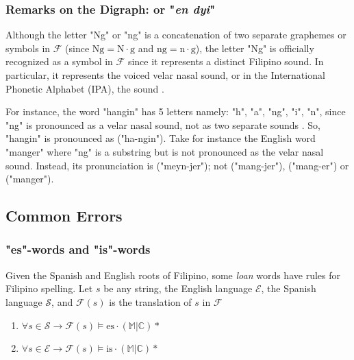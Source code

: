 \subsubsection{Remarks on the Digraph:  or "\textit{en dyi}"}

Although the letter "Ng" or "ng" is a concatenation of two separate graphemes or
symbols in \(\mathcal{F}\) (since \(\text{Ng} = \text{N}\cdot\text{g}\) and
\(\text{ng} = \text{n}\cdot\text{g}\)), the letter "Ng" is officially recognized
as a symbol in \(\mathcal{F}\) since it represents a distinct Filipino sound.
In particular, it represents the voiced velar nasal sound, or in the International
Phonetic Alphabet (IPA), the  sound \cite{Malabonga_2009}.

For instance, the word "hangin" has 5 letters namely: "h", "a", "ng", "i", "n",
since "ng" is pronounced as a velar nasal sound, not as two separate sounds
. So, "hangin" is pronounced as  ("ha-ngin").
Take for instance the English  word "manger" where "ng" is a substring
but is not pronounced as the velar nasal sound. Instead, its pronunciation is
 ("meyn-jer"); not
 ("mang-jer"),
 ("mang-er") or
 ("manger").

\subsection{Common Errors}

\subsubsection{"es"-words and "is"-words}

Given the Spanish and English roots of Filipino, some \textit{loan} words have
rules for Filipino spelling. Let \(s\) be any string, the English language
\(\mathcal{E}\), the Spanish language \(\mathcal{S}\), and \(\mathcal{F}(s)\) is
the translation of \(s\) in \(\mathcal{F}\)

\begin{enumerate}
    \item \(\forall s\in \mathcal{S} \rightarrow \mathcal{F}(s) \models \text{es}\cdot
          (\mathbb{M}|\mathbb{C})* \)
    \item \(\forall s\in \mathcal{E} \rightarrow \mathcal{F}(s) \models \text{is}\cdot
          (\mathbb{M}|\mathbb{C})* \)
\end{enumerate}

